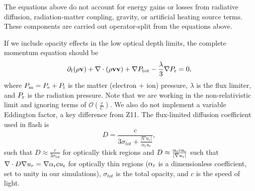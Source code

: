 \documentclass[preprint,11pt]{aastex}
\newcommand{\beq}{\begin{equation}}
\newcommand{\eeq}{\end{equation}}
\begin{document}
The equations above do not account for energy gains or losses from radiative diffusion, radiation-matter coupling, gravity, or artificial heating source terms.  These components are carried out operator-split from the equations above.


If we include opacity effects in the low optical depth limits, the complete momentum equation should be
{\color{blue}
\beq
\label{eq:newmom}
\partial_t (\rho\mathbf{v}) + \nabla \cdot (\rho\mathbf{v}\mathbf{v}) + \nabla P_{\rm tot} - \frac{\lambda}{3} \nabla P_{\rm r}= 0,
\eeq
}
where $P_{\rm m} = P_{\rm e} + P_{\rm i}$ is the matter (electron $+$ ion) pressure, $\lambda$ is the flux limiter, and $P_{\rm r}$ is the radiation pressure.  Note that we are working in the non-relativistic limit and ignoring terms of $\mathcal{O}(\frac{v}{C})$.  We also do not implement a variable Eddington factor, a key difference from Z11.  The flux-limited diffusion coefficient used in flash is
\beq
D = \frac{c}{3\sigma_{tot} + \frac{|\nabla u_{r}|}{\alpha_r u_{r}}},
\eeq
such that $D \approx \frac{c}{3\sigma_{tot}}$ for optically thick regions and $D \approx \frac{\alpha_{\rm r} c u_{\rm r}}{|\nabla u_{\rm r} |}$  such that $\nabla\cdot D \nabla u_{r} = \nabla \alpha_{\rm r} c u_{\rm r}$ for optically thin regions ($\alpha_{\rm r}$ is a dimensionless coefficient, set to unity in our simulations), $\sigma_{tot}$ is the total opacity, and $c$ is the speed of light.
\end{document}

